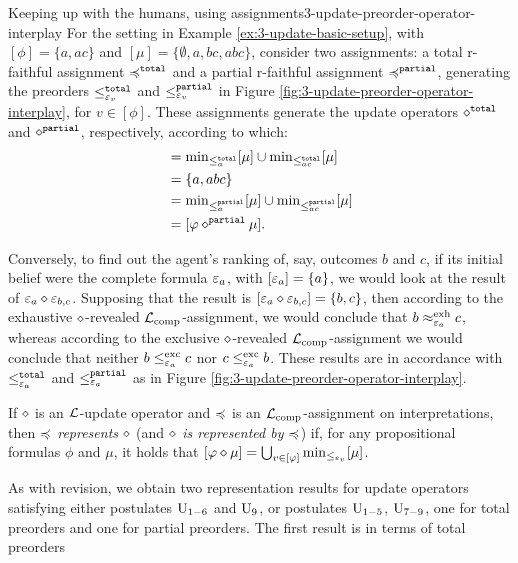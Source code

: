 \begin{xmpl}{Keeping up with the humans, using assignments}{3-update-preorder-operator-interplay}
	For the setting in Example \ref{ex:3-update-basic-setup},
	with 
	$[\phi]=\{a,ac\}$ and $[\mu]=\{\emptyset,a,bc,abc\}$,
	consider two assignments:
	a total r-faithful assignment $\preccurlyeq^{\mathtt{total}}$
	and a partial r-faithful assignment $\preccurlyeq^{\mathtt{partial}}$,
	generating the preorders
	$\le^{\mathtt{total}}_{\varepsilon_{v}}$ 
	and
	$\le^{\mathtt{partial}}_{\varepsilon_{v}}$
	in Figure \ref{fig:3-update-preorder-operator-interplay},
	for $v\in[\phi]$.
	These assignments generate the update operators
	$\diamond^{\mathtt{total}}$ and $\diamond^{\mathtt{partial}}$,
	respectively,
	according to which:
	\begin{align*}
		[\phi\up^{\mathtt{total}}\mu] 												   	&
		=\min_{\le^{\mathtt{total}}_{a}}[\mu]\cup\min_{\le^{\mathtt{total}}_{ac}}[\mu] 	\\
																						   &
		= \{a,abc\}\\
		&= \min_{\le^{\mathtt{partial}}_{a}}[\mu]\cup\min_{\le^{\mathtt{partial}}_{ac}}[\mu]\\
		&=[\phi\up^{\mathtt{partial}}\mu].
	\end{align*}

	Conversely, to find out the agent's ranking of, say, outcomes $b$ and $c$,
	if its initial belief were the complete formula $\varepsilon_{a}$,
	with $[\varepsilon_{a}]=\{a\}$,
	we would look at the result of $\varepsilon_{a}\diamond\varepsilon_{b,c}$.
	Supposing that the result is 
	$[\varepsilon_{a}\diamond\varepsilon_{b,c}]=\{b,c\}$,
	then according to the exhaustive $\diamond$-revealed $\mathcal{L}_{{\operatorname{comp}}}$-assignment,
	we would conclude that $b\approx^{{\operatorname{exh}}}_{\varepsilon_{a}} c$,
	whereas according to the exclusive $\diamond$-revealed $\mathcal{L}_{{\operatorname{comp}}}$-assignment
	we would conclude that neither $b\le^{{\operatorname{exc}}}_{\varepsilon_{a}} c$ nor
	$c\le^{{\operatorname{exc}}}_{\varepsilon_{a}} b$.
	These results are in accordance with
	$\le^{\mathtt{total}}_{\varepsilon_{a}}$ 
	and
	$\le^{\mathtt{partial}}_{\varepsilon_{a}}$
	as in Figure \ref{fig:3-update-preorder-operator-interplay}.
\end{xmpl}

If $\diamond$ is an $\mathcal{L}$-update operator
and $\preccurlyeq$ is an $\mathcal{L}_{{\operatorname{comp}}}$-assignment on interpretations,
then \emph{$\preccurlyeq$ represents $\diamond$}
(and \emph{$\diamond$ is represented by $\preccurlyeq$})
if, for any propositional formulas $\phi$ and $\mu$, it holds that 
$[\varphi\diamond\mu]=\bigcup_{v\in[\varphi]}{\operatorname{min}}_{\le_{\varepsilon_{v}}}[\mu]$.

As with revision, we obtain two representation results 
for update operators satisfying either postulates $\mathrm{U}_{1-6}$ and $\mathrm{U}_{9}$,
or postulates $\mathrm{U}_{1-5}$, $\mathrm{U}_{7-9}$,
one for total preorders and one for partial preorders.
The first result is in terms of total preorders

